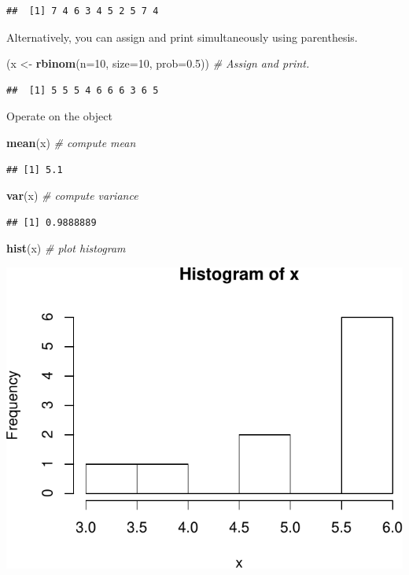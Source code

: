 \documentclass[]{book}
\newenvironment{Shaded}{\begin{snugshade}}{\end{snugshade}}
\newcommand{\KeywordTok}[1]{\textcolor[rgb]{0.13,0.29,0.53}{\textbf{#1}}}
\newcommand{\DataTypeTok}[1]{\textcolor[rgb]{0.13,0.29,0.53}{#1}}
\newcommand{\DecValTok}[1]{\textcolor[rgb]{0.00,0.00,0.81}{#1}}
\newcommand{\FloatTok}[1]{\textcolor[rgb]{0.00,0.00,0.81}{#1}}
\newcommand{\StringTok}[1]{\textcolor[rgb]{0.31,0.60,0.02}{#1}}
\newcommand{\CommentTok}[1]{\textcolor[rgb]{0.56,0.35,0.01}{\textit{#1}}}
\newcommand{\NormalTok}[1]{#1}
\theoremstyle{definition}
\theoremstyle{definition}
\theoremstyle{definition}
\theoremstyle{remark}
\begin{document}
\begin{verbatim}
##  [1] 7 4 6 3 4 5 2 5 7 4
\end{verbatim}

Alternatively, you can assign and print simultaneously using
parenthesis.

\begin{Shaded}
\begin{Highlighting}[]
\NormalTok{(x <-}\StringTok{ }\KeywordTok{rbinom}\NormalTok{(}\DataTypeTok{n=}\DecValTok{10}\NormalTok{, }\DataTypeTok{size=}\DecValTok{10}\NormalTok{, }\DataTypeTok{prob=}\FloatTok{0.5}\NormalTok{))  }\CommentTok{# Assign and print.}
\end{Highlighting}
\end{Shaded}

\begin{verbatim}
##  [1] 5 5 5 4 6 6 6 3 6 5
\end{verbatim}

Operate on the object

\begin{Shaded}
\begin{Highlighting}[]
\KeywordTok{mean}\NormalTok{(x)  }\CommentTok{# compute mean}
\end{Highlighting}
\end{Shaded}

\begin{verbatim}
## [1] 5.1
\end{verbatim}

\begin{Shaded}
\begin{Highlighting}[]
\KeywordTok{var}\NormalTok{(x)  }\CommentTok{# compute variance}
\end{Highlighting}
\end{Shaded}

\begin{verbatim}
## [1] 0.9888889
\end{verbatim}

\begin{Shaded}
\begin{Highlighting}[]
\KeywordTok{hist}\NormalTok{(x) }\CommentTok{# plot histogram}
\end{Highlighting}
\end{Shaded}

\includegraphics[width=0.5\linewidth]{Rcourse_files/figure-latex/unnamed-chunk-15-1}
\end{document}
